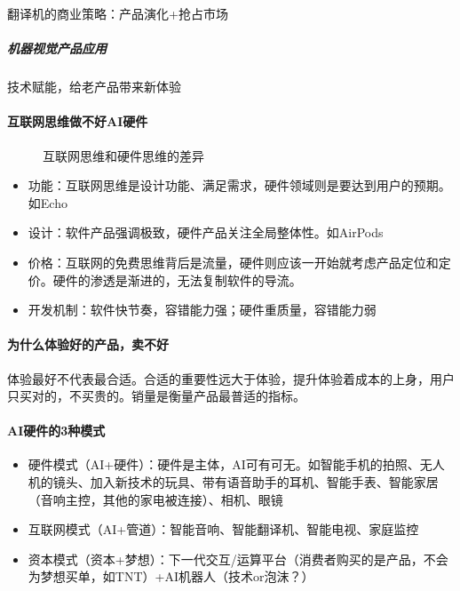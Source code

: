 \documentclass[letterpaper,10pt,english]{sphinxmanual}
\begin{document}
翻译机的商业策略：产品演化+抢占市场


\subparagraph{机器视觉产品应用}
\label{\detokenize{chapter_project/AI_hardware:id12}}
技术赋能，给老产品带来新体验


\paragraph{互联网思维做不好AI硬件}
\label{\detokenize{chapter_project/AI_hardware:id13}}
\begin{figure}[H]
\centering
\capstart

\noindent{}
\caption{互联网思维和硬件思维的差异}\label{\detokenize{chapter_project/AI_hardware:id36}}\end{figure}
\begin{itemize}
\item {} 
功能：互联网思维是设计功能、满足需求，硬件领域则是要达到用户的预期。如Echo

\item {} 
设计：软件产品强调极致，硬件产品关注全局整体性。如AirPods

\item {} 
价格：互联网的免费思维背后是流量，硬件则应该一开始就考虑产品定位和定价。硬件的渗透是渐进的，无法复制软件的导流。

\item {} 
开发机制：软件快节奏，容错能力强；硬件重质量，容错能力弱

\end{itemize}


\paragraph{为什么体验好的产品，卖不好}
\label{\detokenize{chapter_project/AI_hardware:id14}}
体验最好不代表最合适。合适的重要性远大于体验，提升体验着成本的上身，用户只买对的，不买贵的。销量是衡量产品最普适的指标。


\paragraph{AI硬件的3种模式}
\label{\detokenize{chapter_project/AI_hardware:ai3}}\begin{itemize}
\item {} 
硬件模式（AI+硬件）：硬件是主体，AI可有可无。如智能手机的拍照、无人机的镜头、加入新技术的玩具、带有语音助手的耳机、智能手表、智能家居（音响主控，其他的家电被连接）、相机、眼镜

\item {} 
互联网模式（AI+管道）：智能音响、智能翻译机、智能电视、家庭监控

\item {} 
资本模式（资本+梦想）：下一代交互/运算平台（消费者购买的是产品，不会为梦想买单，如TNT）+AI机器人（技术or泡沫？）

\end{itemize}
\end{document}
